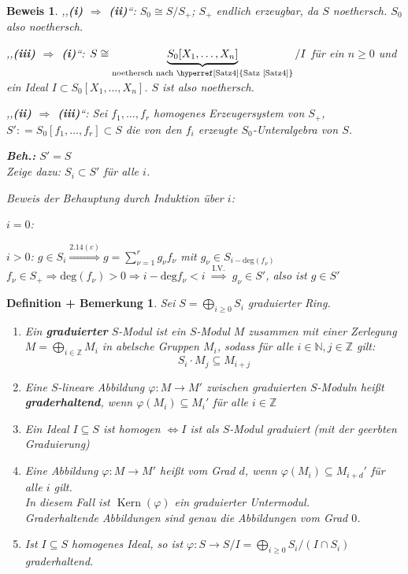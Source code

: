 \documentclass[a4paper,12pt]{scrbook}
\theoremstyle{break}
\newtheorem{DefBem}[Def]{Definition + Bemerkung}
\theoremstyle{nonumberbreak}
\newtheorem{Bew}{Beweis}
\theoremstyle{nonumberplain}
\newcommand{\emp}[1]{\textbf{\emph{#1}}}
\newcommand{\defeqr}[0]{\mathrel{\mathop:}=}
\newcommand{\myref}[2]{%
\hyperref[#2]{#1~\ref*{#2}}%
}
\DeclareMathOperator{\Kern}{Kern}
\begin{document}
\begin{Bew}
,,\textbf{(i) $\Rightarrow$ (ii)}``: $S_0\cong S/S_{+}$; $S_{+}$ endlich erzeugbar, da $S$ noethersch.
$S_0$ also noethersch.

,,\textbf{(iii) $\Rightarrow$ (i)}``: $S\cong \underbrace{S_0[X_1, \ldots, X_n]}_
{\textrm{noethersch nach \myref{Satz}{Satz4}}}/I$ für ein $n\geq 0$
und ein Ideal $I\subset S_0[X_1, \ldots, X_n]$. $S$ ist also noethersch.

,,\textbf{(ii) $\Rightarrow$ (iii)}``: Sei $f_1, \ldots, f_r$ homogenes Erzeugersystem von $S_+$, 
$S'\defeqr S_0[f_1, \ldots, f_r]\subset S$ die von den $f_i$ erzeugte
$S_0$-Unteralgebra von $S$.

\textbf{Beh.:} $S' = S$\\
Zeige dazu: $S_i\subset S'$ für alle $i$.

Beweis der Behauptung durch Induktion über $i$:

$i=0$: \checkmark

$i> 0$: $g\in S_i\stackrel{2.14(c)}{\Rightarrow}g=\sum_{\nu=1}^{r} g_{\nu}f_\nu$ mit
$g_\nu\in S_{i-\textrm{deg}(f_\nu)}$\\
$f_\nu\in S_{+} \Rightarrow \textrm{deg}(f_\nu)> 0 \Rightarrow i-\textrm{deg} f_\nu < i$
$\overset{\text{I.V.}}{\Longrightarrow}$ $g_\nu\in S'$, also ist $g\in S'$

\end{Bew}

\begin{DefBem}
\label{2.16} Sei $S=\bigoplus_{i\geq 0}S_i$ graduierter Ring.
\begin{enumerate}

\item Ein \emp{graduierter} $S$-Modul ist ein $S$-Modul $M$ zusammen mit
einer Zerlegung $M=\bigoplus_{i\in\mathbb{Z}} M_i$ in abelsche Gruppen $M_i$,
sodass für alle $i\in\mathbb{N}, j\in\mathbb{Z}$  gilt:
$$S_i\cdot M_j\subseteq M_{i+j}$$

\item Eine $S$-lineare Abbildung $\varphi:M\to M'$ zwischen graduierten $S$-Moduln
heißt \emp{graderhaltend}, wenn $\varphi(M_i)\subseteq
M_i'$ für alle $i\in \mathbb{Z}$

\item Ein Ideal $I\subseteq S$ ist homogen $\Leftrightarrow I$ ist als $S$-Modul
graduiert (mit der geerbten Graduierung)

\item Eine Abbildung $\varphi: M \to M'$ heißt \textit{vom Grad $d$}, wenn $\varphi(M_i) \subseteq
      M_{i+d}'$ für alle $i$ gilt.\\
      In diesem Fall ist $\Kern(\varphi)$ ein graduierter Untermodul.\\
      Graderhaltende Abbildungen sind genau die Abbildungen vom Grad $0$.
      
\item Ist $I \subseteq S$ homogenes Ideal, so ist $\varphi: S \to S/I =
\bigoplus_{i \ge 0} S_i / (I \cap S_i)$ graderhaltend.\\

\end{enumerate}
\end{DefBem}
\end{document}
